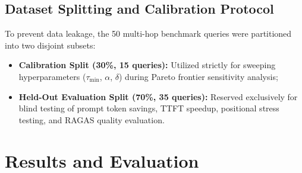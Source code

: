 \documentclass[lettersize,journal]{IEEEtran}
\begin{document}
\subsection{Dataset Splitting and Calibration Protocol}
To prevent data leakage, the 50 multi-hop benchmark queries were partitioned into two disjoint subsets:
\begin{itemize}
    \item \textbf{Calibration Split (30\%, 15 queries):} Utilized strictly for sweeping hyperparameters ($\tau_{\min}$, $\alpha$, $\delta$) during Pareto frontier sensitivity analysis;
    \item \textbf{Held-Out Evaluation Split (70\%, 35 queries):} Reserved exclusively for blind testing of prompt token savings, TTFT speedup, positional stress testing, and RAGAS quality evaluation.
\end{itemize}

\section{Results and Evaluation}
\end{document}
